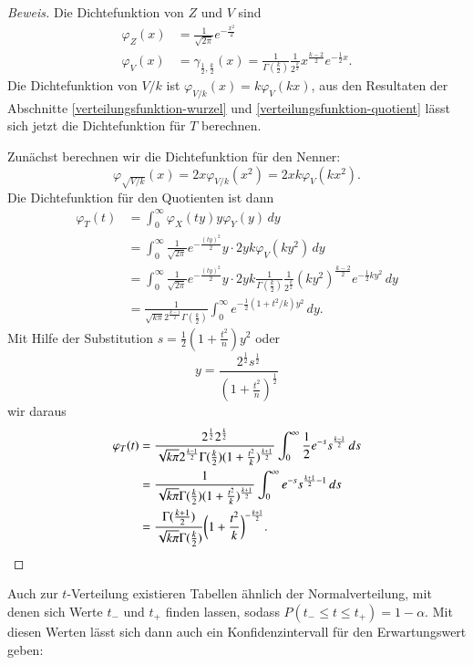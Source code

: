 \begin{proof}[Beweis]
Die Dichtefunktion von $Z$ und $V$ sind
\begin{align*}
\varphi_Z(x)
&=
\frac1{\sqrt{2\pi}}e^{-\frac{x^2}2}
\\
\varphi_V(x)
&=
\gamma_{\frac12,\frac{k}2}(x)
=
\frac1{\Gamma(\frac{k}2)}\frac1{2^\frac{k}2}x^{\frac{k-2}2}e^{-\frac12x}.
\end{align*}
Die Dichtefunktion von $V/k$ ist $\varphi_{V/k}(x)=k\varphi_V(kx)$, aus
den Resultaten der Abschnitte \ref{verteilungsfunktion-wurzel}
und \ref{verteilungsfunktion-quotient} lässt sich jetzt die
Dichtefunktion für $T$ berechnen.

Zunächst berechnen wir die Dichtefunktion für den Nenner:
\[
\varphi_{\sqrt{V/k}}(x)=2x\varphi_{V/k}(x^2)=2xk\varphi_V(kx^2).
\]
Die Dichtefunktion für den Quotienten ist dann
\begin{align*}
\varphi_T(t)
&=
\int_0^\infty \varphi_X(ty)y\varphi_Y(y)\,dy
\\
&=
\int_0^\infty \frac1{\sqrt{2\pi}}e^{-\frac{(ty)^2}2}y\cdot
2yk\varphi_V(ky^2)\,dy
\\
&=
\int_0^\infty \frac1{\sqrt{2\pi}}e^{-\frac{(ty)^2}2}y\cdot
2yk
\frac1{\Gamma(\frac{k}2)}\frac1{2^{\frac{k}2}}(ky^2)^{\frac{k-2}2}e^{-\frac12ky^2}
\,dy
\\
&=
\frac1{\sqrt{k\pi}2^{\frac{k-1}2}\Gamma(\frac{k}2)}
\int_0^\infty e^{-\frac12(1+t^2/k)y^2} \,dy.
\end{align*}
Mit Hilfe der Substitution $s=\frac12(1+\frac{t^2}n)y^2$
oder
\[
y=\frac{2^{\frac12}s^{\frac12}}{(1+\frac{t^2}n)^{\frac12}}
\]
wir daraus
\begin{align*}
\varphi_T(t)
&=
\frac{2^{\frac12}2^{\frac{k}2}}{\sqrt{k\pi}2^{\frac{k-1}2}\Gamma(\frac{k}2)(1+\frac{t^2}k)^{\frac{k+1}2}}
\int_0^\infty \frac12e^{-s}s^{\frac{k-1}2}\,ds
\\
&=
\frac{1}{\sqrt{k\pi}\Gamma(\frac{k}2)(1+\frac{t^2}k)^{\frac{k+1}2}}
\int_0^\infty e^{-s}s^{\frac{k+1}2-1}\,ds
\\
&=
\frac{\Gamma(\frac{k+1}2)}{\sqrt{k\pi}\Gamma(\frac{k}2)}\biggl(1+\frac{t^2}k\biggr)^{-\frac{k+1}2}.
\qedhere
\end{align*}
\end{proof}

Auch zur $t$-Verteilung existieren Tabellen ähnlich der Normalverteilung,
mit denen sich Werte $t_-$ und $t_+$ finden lassen, sodass
$P(t_-\le t\le t_+)=1-\alpha$.
Mit diesen Werten lässt sich dann
auch ein Konfidenzintervall für den Erwartungswert geben:

